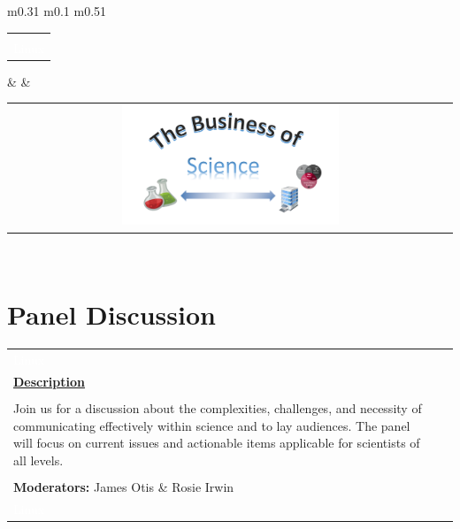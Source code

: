 \documentclass[titlepage,oneside,openany,10pt]{book}
\begin{document}
\begin{tabular}{  m{0.31\textwidth}  m{0.1\textwidth}  m{0.51\textwidth}  }
\begin{tabular}[c]{@{}c@{}}
\begin{tabularx}{1.5\linewidth}{@{}XXX@{}}
CBP participants at this workshop will be entered into a raffle for a \$15 gift card of their choice. \\
\textcolor{white}{Linux}
\end{tabularx}
\end{tabular}
&	 		
& \begin{tabular}[c]{@{}c@{}}  \hspace{0.2cm}\includegraphics[width=0.5\textwidth]{Other_Figures/Business_Of_Science.png}\end{tabular} \\
\bottomrule
\end{tabular}

  
\chapter*{Panel Discussion}
\label{chapter:panel}
%
%
\begin{tabularx}{\linewidth}{@{}XXX@{}}
\toprule
\textcolor{white}{Linux}\\
\textbf{\underline{Description}}\\\\
Join us for a discussion about the complexities, challenges, and necessity of communicating effectively within science and to lay audiences. The panel will focus on current issues and actionable items applicable for scientists of all levels.\\
\\
\textbf{Moderators:}
James Otis \& Rosie Irwin\\
\textcolor{white}{Linux}
\end{tabularx}
\end{document}

